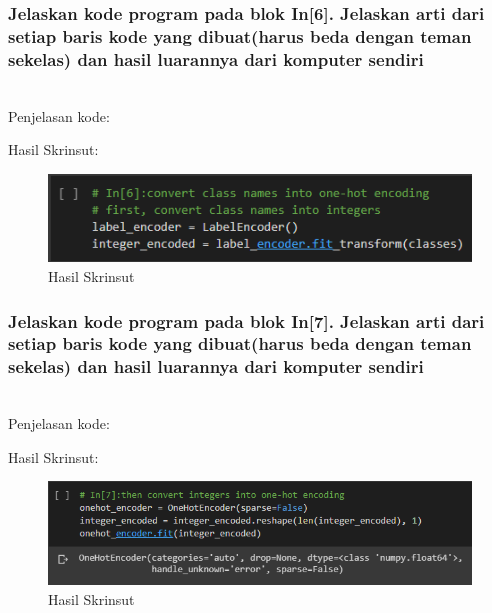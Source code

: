 \subsubsection{Jelaskan kode program pada blok  In[6]. Jelaskan arti dari setiap baris kode yang dibuat(harus beda dengan teman sekelas) dan hasil luarannya dari komputer sendiri}
\hfill\\
Penjelasan kode:

Hasil Skrinsut:
\begin{figure}[H]
	\centering
	\includegraphics[scale=0.5]{figures/1174083/figures7/p6.png}
	\caption{Hasil Skrinsut}
\end{figure}


\subsubsection{Jelaskan kode program pada blok  In[7]. Jelaskan arti dari setiap baris kode yang dibuat(harus beda dengan teman sekelas) dan hasil luarannya dari komputer sendiri}
\hfill\\
Penjelasan kode:

Hasil Skrinsut:
\begin{figure}[H]
	\centering
	\includegraphics[scale=0.5]{figures/1174083/figures7/p7.png}
	\caption{Hasil Skrinsut}
\end{figure}


